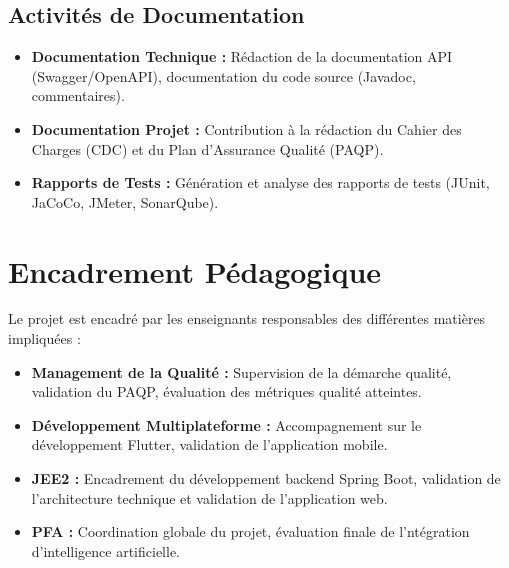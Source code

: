\documentclass[12pt,a4paper]{report}
\begin{document}
\subsection{Activités de Documentation}

\begin{itemize}
    \item \textbf{Documentation Technique :} Rédaction de la documentation API (Swagger/OpenAPI), documentation du code source (Javadoc, commentaires).
    
    \item \textbf{Documentation Projet :} Contribution à la rédaction du Cahier des Charges (CDC) et du Plan d'Assurance Qualité (PAQP).
    
    \item \textbf{Rapports de Tests :} Génération et analyse des rapports de tests (JUnit, JaCoCo, JMeter, SonarQube).
\end{itemize}

\section{Encadrement Pédagogique}

Le projet est encadré par les enseignants responsables des différentes matières impliquées :

\begin{itemize}
    \item \textbf{Management de la Qualité :} Supervision de la démarche qualité, validation du PAQP, évaluation des métriques qualité atteintes.
    
    \item \textbf{Développement Multiplateforme :} Accompagnement sur le développement Flutter, validation de l'application mobile.
    
    \item \textbf{JEE2 :} Encadrement du développement backend Spring Boot, validation de l'architecture technique et validation de l'application web.
    
    \item \textbf{PFA :} Coordination globale du projet, évaluation finale de l’ntégration d’intelligence artificielle.
\end{itemize}

\newpage

\end{document}

